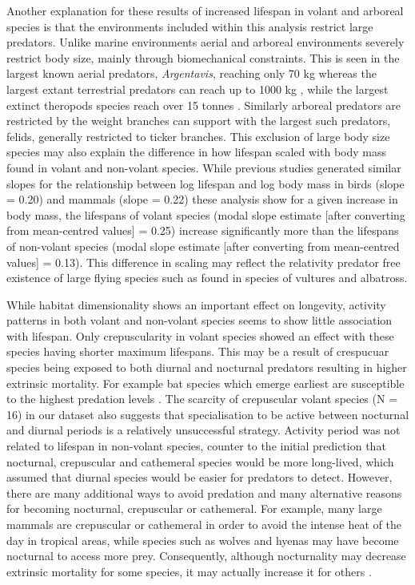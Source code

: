 Another explanation for these results of increased lifespan in volant and arboreal species is that the environments included within this analysis restrict large predators. Unlike marine environments aerial and arboreal environments severely restrict body size, mainly through biomechanical constraints. This is seen in the largest known aerial predators, \textit{Argentavis}, reaching only 70 kg \citep{chatterjee2007aerodynamics} whereas the largest extant terrestrial predators can reach up to 1000 kg \citep{carwardine1995guinness}, while the largest extinct theropods species reach over 15 tonnes \citep{therrien2007my}. Similarly arboreal predators are restricted by the weight branches can support with the largest such predators, felids, generally restricted to ticker branches. This exclusion of large body size species may also explain the difference in how lifespan scaled with body mass found in volant and non-volant species. While previous studies generated similar slopes for the relationship between log lifespan and log body mass in birds (slope = 0.20) and mammals (slope = 0.22) \citep{lindstedt1981body,hulbert2007life} these analysis show for a given increase in body mass, the lifespans of volant species (modal slope estimate [after converting from mean-centred values] = 0.25) increase significantly more than the lifespans of non-volant species (modal slope estimate [after converting from mean-centred values] = 0.13). This difference in scaling may reflect the relativity predator free existence of large flying species such as found in species of vultures and albatross.


While habitat dimensionality shows an important effect on longevity, activity patterns in both volant and non-volant species seems to show little association with lifespan. Only crepuscularity in volant species showed an effect with these species having shorter maximum lifespans. This may be a result of crespucuar species being exposed to both diurnal and nocturnal predators resulting in higher extrinsic mortality. For example bat species which emerge earliest are susceptible to the highest predation levels \citep{jones1994foraging}. The scarcity of crepuscular volant species (N = 16) in our dataset also suggests that specialisation to be active between nocturnal and diurnal periods is a relatively unsuccessful strategy. Activity period was not related to lifespan in non-volant species, counter to the initial prediction that nocturnal, crepuscular and cathemeral species would be more long-lived, which assumed that diurnal species would be easier for predators to detect. However, there are many additional ways to avoid predation and many alternative reasons for becoming nocturnal, crepuscular or cathemeral. For example, many large mammals are crepuscular or cathemeral in order to avoid the intense heat of the day in tropical areas, while species such as wolves and hyenas may have become nocturnal to access more prey. Consequently, although nocturnality may decrease extrinsic mortality for some species, it may actually increase it for others \cite{prugh2014does}.


